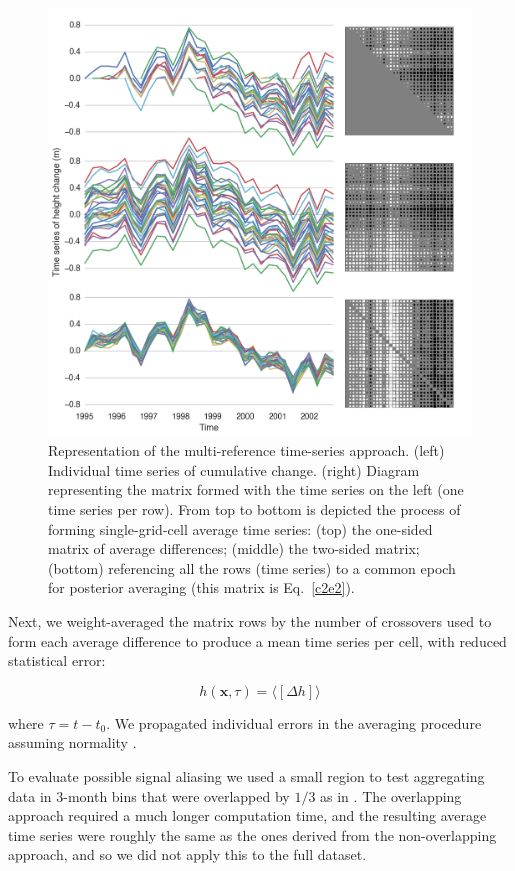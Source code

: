 \begin{figure}[!ht]
  \centering
  \includegraphics[width=.85\textwidth]{img/multiref_matrix_v4.png}
  \caption[Schematic of the multi-reference time-series approach]{
  Representation of the multi-reference time-series approach. (left) Individual time series of cumulative change. (right) Diagram representing the matrix formed with the time series on the left (one time series per row). From top to bottom is depicted the process of forming single-grid-cell average time series: (top) the one-sided matrix of average differences; (middle) the two-sided matrix; (bottom) referencing all the rows (time series) to a common epoch for posterior averaging (this matrix is Eq.~\ref{c2e2}).} 
  \label{c2f3}
\end{figure}


Next, we weight-averaged the matrix rows by the number of crossovers used to form each average difference to produce a mean time series per cell, with reduced statistical error:

\begin{equation}
  h(\mathbf x, \tau) = \langle [\Delta h] \rangle 
  \label{c2e3}
\end{equation}

\noindent
where $\tau = t - t_0$. We propagated individual errors in the averaging procedure assuming normality \parencite{Li2006}.

To evaluate possible signal aliasing we used a small region to test aggregating data in 3-month bins that were overlapped by $1/3$ as in \textcite{Khvorostovsky2012}. The overlapping approach required a much longer computation time, and the resulting average time series were roughly the same as the ones derived from the non-overlapping approach, and so we did not apply this to the full dataset.

